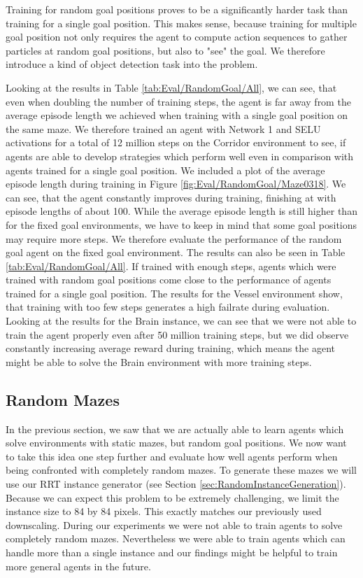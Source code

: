 Training for random goal positions proves to be a significantly harder task than training for a single goal position. This makes sense, because training for multiple goal position not only requires the agent to compute action sequences to gather particles at random goal positions, but also to "see" the goal. We therefore introduce a kind of object detection task into the problem. 

Looking at the results in Table \ref{tab:Eval/RandomGoal/All}, we can see, that even when doubling the number of training steps, the agent is far away from the average episode length we achieved when training with a single goal position on the same maze. We therefore trained an agent with Network 1 and SELU activations for a total of 12 million steps on the Corridor environment to see, if agents are able to develop strategies which perform well even in comparison with agents trained for a single goal position. We included a plot of the average episode length during training in Figure \ref{fig:Eval/RandomGoal/Maze0318}. We can see, that the agent constantly improves during training, finishing at with episode lengths of about 100. While the average episode length is still higher than for the fixed goal environments, we have to keep in mind that some goal positions may require more steps. We therefore evaluate the performance of the random goal agent on the fixed goal environment. The results can also be seen in Table \ref{tab:Eval/RandomGoal/All}. If trained with enough steps, agents which were trained with random goal positions come close to the performance of agents trained for a single goal position. The results for the Vessel environment show, that training with too few steps generates a high failrate during evaluation. Looking at the results for the Brain instance, we can see that we were not able to train the agent properly even after 50 million training steps, but we did observe constantly increasing average reward during training, which means the agent might be able to solve the Brain environment with more training steps.  

\subsection{Random Mazes} \label{sec:EvalRandomMaze}
In the previous section, we saw that we are actually able to learn agents which solve environments with static mazes, but random goal positions. We now want to take this idea one step further and evaluate how well agents perform when being confronted with completely random mazes. To generate these mazes we will use our RRT instance generator (see Section \ref{sec:RandomInstanceGeneration}). Because we can expect this problem to be extremely challenging, we limit the instance size to 84 by 84 pixels. This exactly matches our previously used downscaling. During our experiments we were not able to train agents to solve completely random mazes. Nevertheless we were able to train agents which can handle more than a single instance and our findings might be helpful to train more general agents in the future.

